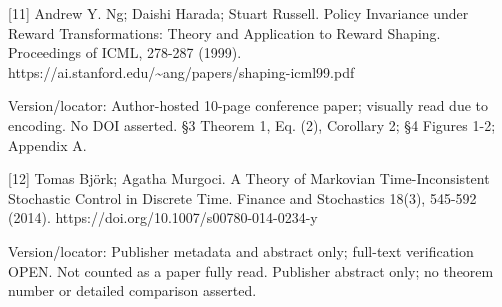 \documentclass[10pt,a4paper]{article}
\begin{document}
[11] Andrew Y. Ng; Daishi Harada; Stuart Russell. Policy Invariance under Reward Transformations: Theory and Application to Reward Shaping. Proceedings of ICML, 278-287 (1999). https://ai.stanford.edu/\textasciitilde{}ang/papers/shaping-icml99.pdf

Version/locator: Author-hosted 10-page conference paper; visually read due to encoding. No DOI asserted. §3 Theorem 1, Eq. (2), Corollary 2; §4 Figures 1-2; Appendix A.

[12] Tomas Björk; Agatha Murgoci. A Theory of Markovian Time-Inconsistent Stochastic Control in Discrete Time. Finance and Stochastics 18(3), 545-592 (2014). https://doi.org/10.1007/s00780-014-0234-y

Version/locator: Publisher metadata and abstract only; full-text verification OPEN. Not counted as a paper fully read. Publisher abstract only; no theorem number or detailed comparison asserted.
\end{document}
